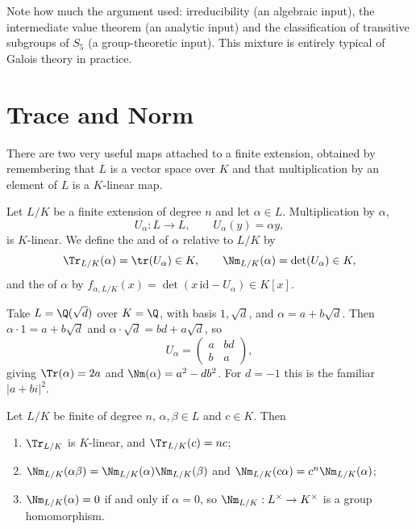 \begin{remark}
	Note how much the argument used: irreducibility (an algebraic input), the intermediate value theorem (an analytic input) and the classification of transitive subgroups of $S_5$ (a group-theoretic input). This mixture is entirely typical of Galois theory in practice.
\end{remark}

\section{Trace and Norm}\label{sec:tracenorm}

There are two very useful maps attached to a finite extension, obtained by remembering that $L$ is a vector space over $K$ and that multiplication by an element of $L$ is a $K$-linear map.

\begin{definition}
	Let $L/K$ be a finite extension of degree $n$ and let $\alpha \in L$. Multiplication by $\alpha$,
	$$U_\alpha : L \to L, \qquad U_\alpha(y) = \alpha y,$$
	is $K$-linear. We define the  and  of $\alpha$ relative to $L/K$ by
	$$\Tr_{L/K}(\alpha) = \tr(U_\alpha)\in K, \qquad \Nm_{L/K}(\alpha) = \det(U_\alpha)\in K,$$
	and the  of $\alpha$ by $f_{\alpha, L/K}(x) = \det(x\,\mathrm{id} - U_\alpha)\in K[x]$.
\end{definition}

\begin{example}
	Take $L = \Q(\sqrt d)$ over $K = \Q$, with basis $1, \sqrt d$, and $\alpha = a+b\sqrt d$. Then $\alpha\cdot 1 = a + b\sqrt d$ and $\alpha\cdot\sqrt d = bd + a\sqrt d$, so
	$$U_\alpha = \begin{pmatrix} a & bd\\ b& a\end{pmatrix},$$
	giving $\Tr(\alpha) = 2a$ and $\Nm(\alpha) = a^2-db^2$. For $d = -1$ this is the familiar $|a+bi|^2$.
\end{example}

\begin{lemma}\label{lem:tracenormbasic}
	Let $L/K$ be finite of degree $n$, $\alpha,\beta\in L$ and $c \in K$. Then
	\begin{enumerate}[label=(\roman*)]
		\item $\Tr_{L/K}$ is $K$-linear, and $\Tr_{L/K}(c) = nc$;
		\item $\Nm_{L/K}(\alpha\beta) = \Nm_{L/K}(\alpha)\Nm_{L/K}(\beta)$ and $\Nm_{L/K}(c\alpha) = c^n\Nm_{L/K}(\alpha)$;
		\item $\Nm_{L/K}(\alpha) = 0$ if and only if $\alpha = 0$, so $\Nm_{L/K}: L^\times\to K^\times$ is a group homomorphism.
	\end{enumerate}
\end{lemma}

